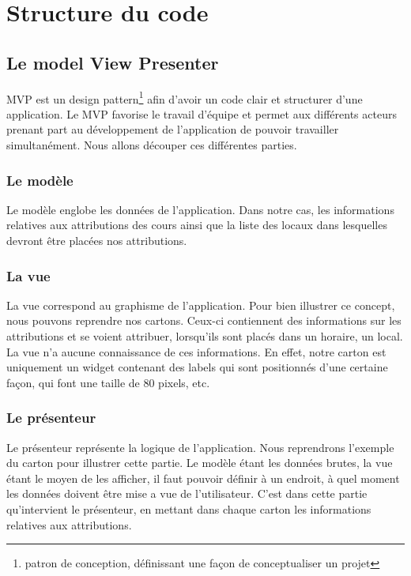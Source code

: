 
\chapter{Structure du code}

\section{Le model View Presenter}
MVP est un design pattern\footnote{patron de conception, définissant une façon de conceptualiser un projet} afin d'avoir un code clair et structurer d'une application. Le MVP favorise le travail d'équipe et permet aux différents acteurs prenant part au développement de l'application de pouvoir travailler simultanément. Nous allons découper ces différentes parties.

\subsection{Le modèle}
Le modèle englobe les données de l'application. Dans notre cas, les informations relatives aux attributions des cours ainsi que la liste des locaux dans lesquelles devront être placées nos attributions.

\subsection{La vue}
La vue correspond au graphisme de l'application. Pour bien illustrer ce concept, nous pouvons reprendre nos cartons. Ceux-ci contiennent des informations sur les attributions et se voient attribuer, lorsqu'ils sont placés dans un horaire, un local. La vue n'a aucune connaissance de ces informations. En effet, notre carton est uniquement un widget contenant des labels qui  sont positionnés d'une certaine façon, qui font une taille de 80 pixels, etc. 

\subsection{Le présenteur}
Le présenteur représente la logique de l'application. Nous reprendrons l'exemple du carton pour illustrer cette partie. Le modèle étant les données brutes, la vue étant le moyen de les afficher, il faut pouvoir définir à un endroit, à quel moment les données doivent être mise a vue de l'utilisateur. C'est dans cette partie qu'intervient le présenteur, en mettant dans chaque carton les informations relatives aux attributions.
 

